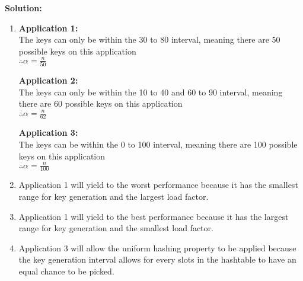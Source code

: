 \documentclass[9pt]{article}
\begin{document}
\textbf{Solution:} \\
\begin{enumerate}
    \item 
        \textbf{Application 1:} \\
        The keys can only be within the 30 to 80 interval, meaning there are 50 possible keys on this application\\
		$\therefore \alpha = \frac{n}{50}$

		\vspace{0.5cm}
        \textbf{Application 2:} \\
		The keys can only be within the 10 to 40 and 60 to 90 interval, meaning there are 60 possible keys on this application\\
		$\therefore \alpha = \frac{n}{62}$

		\vspace{0.5cm}
        \textbf{Application 3:}\\
		The keys can be within the 0 to 100 interval, meaning there are 100 possible keys on this application\\
		$\therefore \alpha = \frac{n}{100}$

    \item 
        Application 1 will yield to the worst performance because it has the smallest range for key generation and the largest load factor.
     
    \item
		Application 1 will yield to the best performance because it has the largest range for key generation and the smallest load factor.
    
    \item
        Application 3 will allow the uniform hashing property to be applied because the key generation interval allows for every slots in the hashtable to have an equal chance to be picked.
\end{enumerate}

\fi

\newpage

\end{document}
